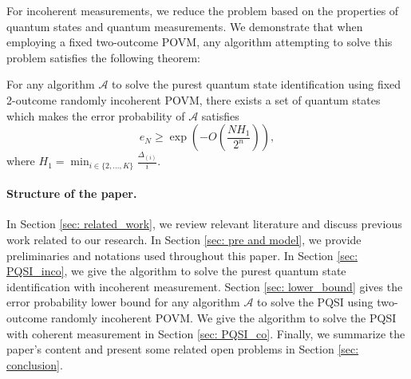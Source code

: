 For incoherent measurements, we reduce the problem based on the properties of quantum states and quantum measurements. We demonstrate that when employing a fixed two-outcome POVM, any algorithm attempting to solve this problem satisfies the following theorem:

\begin{theorem} 
    For any algorithm $\mathcal{A}$ to solve the purest quantum state identification using fixed 2-outcome randomly incoherent POVM, there exists a set of quantum states which makes the error probability of $\mathcal{A}$ satisfies
\begin{equation}
    e_N \geq \exp\left( -O\left(\frac{NH_1}{2^n}\right)\right),
\end{equation}
where $H_1 = \min_{i \in \{2,...,K\}} \frac{\Delta_{(i)}}{i}$.
\end{theorem}

\paragraph{Structure of the paper.} In Section \ref{sec: related_work}, we review relevant literature and discuss previous work related to our research. In Section \ref{sec: pre and model}, we provide preliminaries and notations used throughout this paper. In Section \ref{sec: PQSI_inco}, we give the algorithm to solve the purest quantum state identification with incoherent measurement. Section \ref{sec: lower_bound} gives the error probability lower bound for any algorithm $\mathcal{A}$ to solve the PQSI using two-outcome randomly incoherent POVM. We give the algorithm to solve the PQSI with coherent measurement in Section \ref{sec: PQSI_co}. Finally, we summarize the paper's content and present some related open problems in Section \ref{sec: conclusion}.
